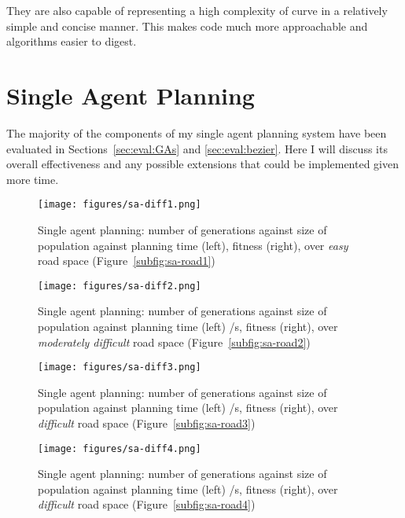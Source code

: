 They are also capable of representing a high complexity of curve in a relatively simple and concise manner. This makes code much more approachable and algorithms easier to digest.

\section{Single Agent Planning}

The majority of the components of my single agent planning system have been evaluated in Sections~\ref{sec:eval:GAs} and \ref{sec:eval:bezier}. Here I will discuss its overall effectiveness and any possible extensions that could be implemented given more time.


\begin{figure}[ht]
  \centering
  \texttt{[image: figures/sa-diff1.png]}
  \caption{\label{fig:sa-col} Single agent planning: number of generations against size of population against planning time (left), fitness (right), over \textit{easy} road space (Figure~\ref{subfig:sa-road1})}
\end{figure}

\begin{figure}[ht]
  \centering
  \texttt{[image: figures/sa-diff2.png]}
  \caption{\label{fig:sa-diff2} Single agent planning: number of generations against size of population against planning time (left) /s, fitness (right), over \textit{moderately difficult} road space (Figure~\ref{subfig:sa-road2})}
\end{figure}

\begin{figure}[ht]
  \centering
  \texttt{[image: figures/sa-diff3.png]}
  \caption{\label{fig:sa-diff3} Single agent planning: number of generations against size of population against planning time (left) /s, fitness (right), over \textit{difficult} road space (Figure~\ref{subfig:sa-road3})}
\end{figure}

\begin{figure}[ht]
  \centering
  \texttt{[image: figures/sa-diff4.png]}
  \caption{\label{fig:sa-diff4} Single agent planning: number of generations against size of population against planning time (left) /s, fitness (right), over \textit{difficult} road space (Figure~\ref{subfig:sa-road4})}
\end{figure}

